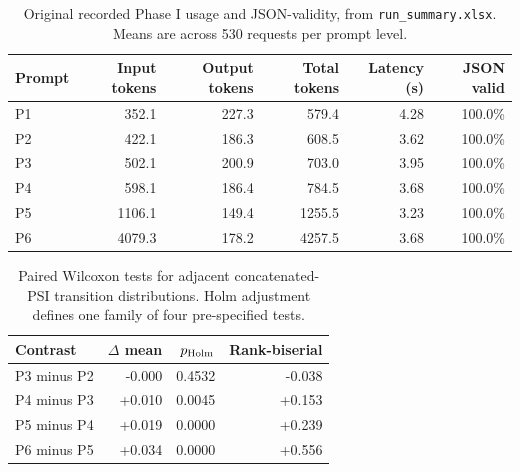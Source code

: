 \begin{table}[t]
\centering
\small
\caption{Original recorded Phase I usage and JSON-validity, from \texttt{run\_summary.xlsx}. Means are across 530 requests per prompt level.}
\label{tab:phase1-recovered-tokens}
\begin{tabular}{lrrrrr}
\toprule
Prompt & Input tokens & Output tokens & Total tokens & Latency (s) & JSON valid \\
\midrule
P1 & 352.1 & 227.3 & 579.4 & 4.28 & 100.0\% \\
P2 & 422.1 & 186.3 & 608.5 & 3.62 & 100.0\% \\
P3 & 502.1 & 200.9 & 703.0 & 3.95 & 100.0\% \\
P4 & 598.1 & 186.4 & 784.5 & 3.68 & 100.0\% \\
P5 & 1106.1 & 149.4 & 1255.5 & 3.23 & 100.0\% \\
P6 & 4079.3 & 178.2 & 4257.5 & 3.68 & 100.0\% \\
\bottomrule
\end{tabular}
\end{table}

\begin{table}[t]
\centering
\small
\caption{Paired Wilcoxon tests for adjacent concatenated-PSI transition distributions. Holm adjustment defines one family of four pre-specified tests.}
\label{tab:phase1-recovered-stats}
\begin{tabular}{lrrr}
\toprule
Contrast & $\Delta$ mean & $p_{\rm Holm}$ & Rank-biserial \\
\midrule
P3 minus P2 & -0.000 & 0.4532 & -0.038 \\
P4 minus P3 & +0.010 & 0.0045 & +0.153 \\
P5 minus P4 & +0.019 & 0.0000 & +0.239 \\
P6 minus P5 & +0.034 & 0.0000 & +0.556 \\
\bottomrule
\end{tabular}
\end{table}

